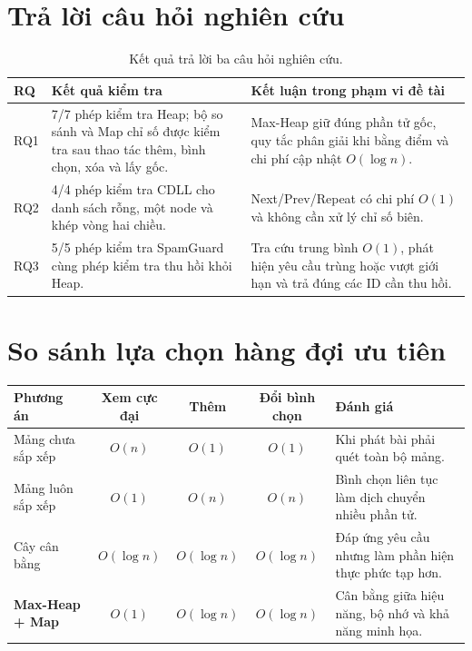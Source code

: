 \documentclass[12pt,a4paper,twoside,openright]{report}
\begin{document}
\section{Trả lời câu hỏi nghiên cứu}
\begin{table}[h]\centering\small
\begin{tabularx}{\textwidth}{@{}p{1cm}p{5.1cm}X@{}}
\toprule
\textbf{RQ} & \textbf{Kết quả kiểm tra} & \textbf{Kết luận trong phạm vi đề tài}\\
\midrule
RQ1 & 7/7 phép kiểm tra Heap; bộ so sánh và Map chỉ số được kiểm tra sau thao tác thêm,
bình chọn, xóa và lấy gốc. & Max-Heap giữ đúng phần tử gốc, quy tắc phân giải khi bằng điểm
và chi phí cập nhật $O(\log n)$.\\
RQ2 & 4/4 phép kiểm tra CDLL cho danh sách rỗng, một node và khép vòng hai chiều. &
Next/Prev/Repeat có chi phí $O(1)$ và không cần xử lý chỉ số biên.\\
RQ3 & 5/5 phép kiểm tra SpamGuard cùng phép kiểm tra thu hồi khỏi Heap. & Tra cứu trung
bình $O(1)$, phát hiện yêu cầu trùng hoặc vượt giới hạn và trả đúng các ID cần thu hồi.\\
\bottomrule
\end{tabularx}
\caption{Kết quả trả lời ba câu hỏi nghiên cứu.}
\label{tab:rq-results}
\end{table}

\section{So sánh lựa chọn hàng đợi ưu tiên}
\begin{table}[h]\centering\small
\begin{tabularx}{\textwidth}{@{}lcccX@{}}
\toprule
\textbf{Phương án} & \textbf{Xem cực đại} & \textbf{Thêm} & \textbf{Đổi bình chọn} & \textbf{Đánh giá}\\
\midrule
Mảng chưa sắp xếp & $O(n)$ & $O(1)$ & $O(1)$ & Khi phát bài phải quét toàn bộ mảng.\\
Mảng luôn sắp xếp & $O(1)$ & $O(n)$ & $O(n)$ & Bình chọn liên tục làm dịch chuyển nhiều phần tử.\\
Cây cân bằng & $O(\log n)$ & $O(\log n)$ & $O(\log n)$ & Đáp ứng yêu cầu nhưng làm phần hiện thực phức tạp hơn.\\
\textbf{Max-Heap + Map} & \textbf{$O(1)$} & \textbf{$O(\log n)$} & \textbf{$O(\log n)$} &
Cân bằng giữa hiệu năng, bộ nhớ và khả năng minh họa.\\
\bottomrule
\end{tabularx}
\end{table}
\end{document}
